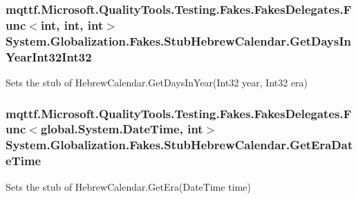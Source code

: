 \hypertarget{class_system_1_1_globalization_1_1_fakes_1_1_stub_hebrew_calendar_a7d3b3465c4d3d973ad24c1692dbab59f}{
\subsubsection[{Get\-Days\-In\-Year\-Int32\-Int32}]{\setlength{\rightskip}{0pt plus 5cm}mqttf.\-Microsoft.\-Quality\-Tools.\-Testing.\-Fakes.\-Fakes\-Delegates.\-Func$<$int, int, int$>$ System.\-Globalization.\-Fakes.\-Stub\-Hebrew\-Calendar.\-Get\-Days\-In\-Year\-Int32\-Int32}}\label{class_system_1_1_globalization_1_1_fakes_1_1_stub_hebrew_calendar_a7d3b3465c4d3d973ad24c1692dbab59f}


Sets the stub of Hebrew\-Calendar.\-Get\-Days\-In\-Year(\-Int32 year, Int32 era)

\hypertarget{class_system_1_1_globalization_1_1_fakes_1_1_stub_hebrew_calendar_a946e20b815a47a5cf5c2349af5c2e162}{
\subsubsection[{Get\-Era\-Date\-Time}]{\setlength{\rightskip}{0pt plus 5cm}mqttf.\-Microsoft.\-Quality\-Tools.\-Testing.\-Fakes.\-Fakes\-Delegates.\-Func$<$global.\-System.\-Date\-Time, int$>$ System.\-Globalization.\-Fakes.\-Stub\-Hebrew\-Calendar.\-Get\-Era\-Date\-Time}}\label{class_system_1_1_globalization_1_1_fakes_1_1_stub_hebrew_calendar_a946e20b815a47a5cf5c2349af5c2e162}


Sets the stub of Hebrew\-Calendar.\-Get\-Era(\-Date\-Time time)

